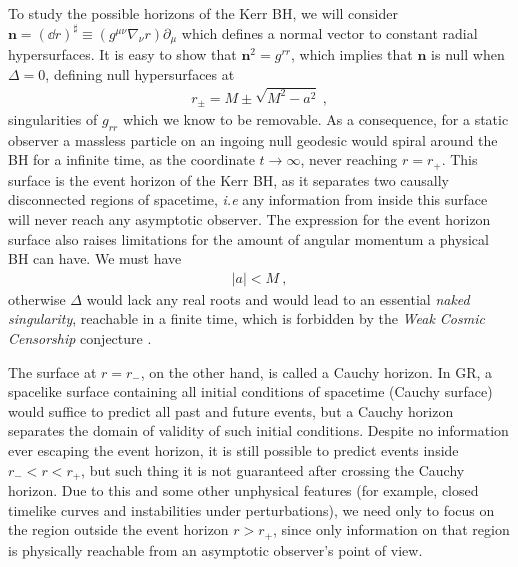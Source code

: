 To study the possible horizons of the Kerr BH, we will consider $\bm{n} = (\dd r)^\sharp \equiv (g^{\mu\nu} \nabla_\nu r) \partial_\mu$ which defines a normal vector to constant radial hypersurfaces.
It is easy to show that $\bm{n}^2 = g^{rr}$, which implies that $\bm{n}$ is null when $\Delta=0$, defining null hypersurfaces at 
\begin{align}
    r_\pm = M \pm \sqrt{M^2 - a^2} ~,
    \label{eq2:KerrRadius}
\end{align}
singularities of $g_{rr}$ which we know to be removable.
As a consequence, for a static observer a massless particle on an ingoing null geodesic would spiral around the BH for a infinite time, as the coordinate $t\to\infty$, never reaching $r=r_{+}$.
This surface is the event horizon of the Kerr BH, as it separates two causally disconnected regions of spacetime, \emph{i.e} any information from inside this surface will never reach any asymptotic observer. 
The expression for the event horizon surface also raises limitations for the amount of angular momentum a physical BH can have.
We must have 
\begin{align}
    |a| < M ~,
    \label{eq2:spinLimit}
\end{align}
otherwise $\Delta$ would lack any real roots and would lead to an essential \emph{naked singularity}, reachable in a finite time, which is forbidden by the \emph{Weak Cosmic Censorship} conjecture \cite{Townsend1997}.  

The surface at $r=r_{-}$, on the other hand, is called a Cauchy horizon.
In GR, a spacelike surface containing all initial conditions of spacetime (Cauchy surface) would suffice to predict all past and future events, but a Cauchy horizon separates the domain of validity of such initial conditions.
Despite no information ever escaping the event horizon, it is still possible to predict events inside $r_{-} < r < r_{+}$, but such thing it is not guaranteed after crossing the Cauchy horizon.
Due to this and some other unphysical features (for example, closed timelike curves and instabilities under perturbations), we need only to focus on the region outside the event horizon $r>r_{+}$, since only information on that region is physically reachable from an asymptotic observer's point of view.

